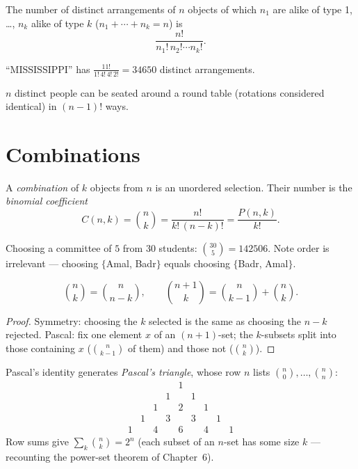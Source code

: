 \begin{theorem}\label{thm:msperm}
The number of distinct arrangements of $n$ objects of which $n_1$ are alike
of type 1, \ldots, $n_k$ alike of type $k$ ($n_1 + \cdots + n_k = n$) is
\[
\frac{n!}{n_1!\,n_2!\cdots n_k!}.
\]
\end{theorem}

\begin{example}
``MISSISSIPPI'' has $\frac{11!}{1!\,4!\,4!\,2!} = 34650$ distinct
arrangements.
\end{example}

\begin{theorem}
$n$ distinct people can be seated around a round table (rotations considered
identical) in $(n-1)!$ ways.
\end{theorem}

\section{Combinations}

\begin{definition}
A \emph{combination} of $k$ objects from $n$ is an unordered selection. Their
number is the \emph{binomial coefficient}
\[
C(n,k) = \binom{n}{k} = \frac{n!}{k!\,(n-k)!} = \frac{P(n,k)}{k!}.
\]
\end{definition}

\begin{example}
Choosing a committee of $5$ from $30$ students:
$\binom{30}{5} = 142506$. Note order is irrelevant --- choosing
$\{$Amal, Badr$\}$ equals choosing $\{$Badr, Amal$\}$.
\end{example}

\begin{theorem}\label{thm:pascal}
\[
\binom{n}{k} = \binom{n}{n-k},
\qquad
\binom{n+1}{k} = \binom{n}{k-1} + \binom{n}{k}.
\]
\end{theorem}

\begin{proof}
Symmetry: choosing the $k$ selected is the same as choosing the $n-k$
rejected. Pascal: fix one element $x$ of an $(n+1)$-set; the $k$-subsets
split into those containing $x$ ($\binom{n}{k-1}$ of them) and those not
($\binom{n}{k}$).
\end{proof}

Pascal's identity generates \emph{Pascal's triangle}, whose row $n$ lists
$\binom{n}{0}, \ldots, \binom{n}{n}$:
\[
\begin{array}{ccccccccc}
&&&&1&&&&\\
&&&1&&1&&&\\
&&1&&2&&1&&\\
&1&&3&&3&&1&\\
1&&4&&6&&4&&1
\end{array}
\]
Row sums give $\sum_k \binom{n}{k} = 2^n$ (each subset of an $n$-set has some
size $k$ --- recounting the power-set theorem of Chapter~6).

